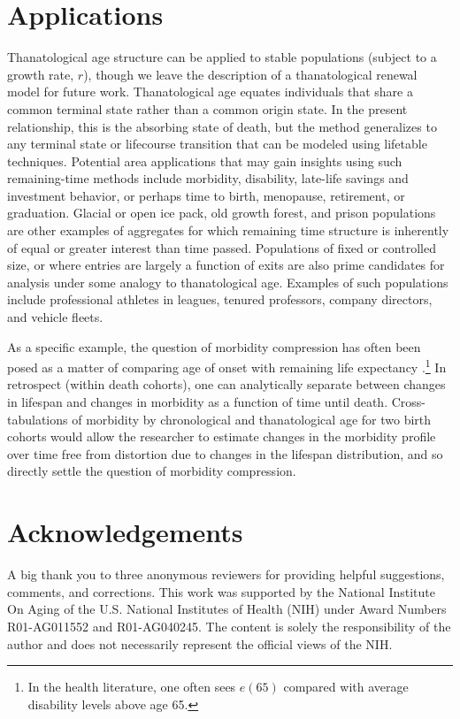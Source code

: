 \documentclass[leqno]{article}
\begin{document}
\section*{Applications}
Thanatological age structure can be applied to stable populations (subject to a
growth rate, $r$), though we leave the description of a thanatological
renewal model for future work. Thanatological age equates individuals that share
a common terminal state rather than a common origin state. In the present
relationship, this is the absorbing state of death, but the method generalizes to any terminal state
or lifecourse transition that can be modeled using lifetable techniques. Potential area
applications that may gain insights using such remaining-time methods
include morbidity, disability, late-life savings and investment behavior, or
perhaps time to birth, menopause, retirement, or graduation. Glacial or open
ice pack, old growth forest, and prison populations are other examples of
aggregates for which remaining time structure is inherently of equal or greater
interest than time passed. Populations of fixed or controlled size, or where
entries are largely a function of exits are also prime candidates for analysis under some
analogy to thanatological age. Examples of such populations include professional
athletes in leagues, tenured professors, company directors, and vehicle fleets.

As a specific example, the question of morbidity compression has often been
posed as a matter of comparing age of onset with remaining life expectancy
\citep[e.g., ][]{fries2002aging,fries2003measuring}.\footnote{In the health
literature, one often sees $e(65)$ compared with average disability levels above age 65.} In
retrospect (within death cohorts), one can analytically separate between changes
in lifespan and changes in morbidity as a function of time until death. Cross-tabulations of morbidity by chronological and thanatological age for two birth cohorts would allow the
researcher to estimate changes in the morbidity profile over time free from
distortion due to changes in the lifespan distribution, and so directly settle
the question of morbidity compression.

\section*{Acknowledgements}
A big thank you to three anonymous reviewers for providing helpful 
suggestions, comments, and corrections. This work was supported by the National Institute On
Aging of the U.S. National Institutes of Health (NIH) under Award Numbers
R01-AG011552 and R01-AG040245. The content is solely the responsibility of the
author and does not necessarily represent the official views of the NIH.


\end{document}
